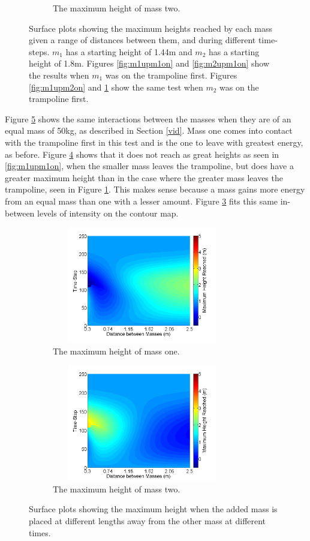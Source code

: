 \begin{figure}[H]
\begin{subfigure}{0.45\textwidth}
    	\caption{The maximum height of mass two.}\label{fig:m2upm2on}
    \end{subfigure}\hfill
    \caption{Surface plots showing the maximum heights reached by each mass given a range of distances between them, and during different time-steps. $m_1$ has a starting height of 1.44m and $m_2$ has a starting height of 1.8m. Figures \ref{fig:m1upm1on} and \ref{fig:m2upm1on} show the results when $m_1$ was on the trampoline first. Figures \ref{fig:m1upm2on} and \ref{fig:m2upm2on} show the same test when $m_2$ was on the trampoline first.}\label{fig:mup1on}
\end{figure}


\noindent Figure \ref{fig:msup} shows the same interactions between the masses when they are of an equal mass of 50kg, as described in Section \ref{vid}. Mass one comes into contact with the trampoline first in this test and is the one to leave with greatest energy, as before. Figure \ref{fig:m2sup} shows that it does not reach as great heights as seen in \ref{fig:m1upm1on}, when the smaller mass leaves the trampoline, but does have a greater maximum height than in the case where the greater mass leaves the trampoline, seen in Figure \ref{fig:m2upm2on}. This makes sense because a mass gains more energy from an equal mass than one with a lesser amount. Figure \ref{fig:m1sup} fits this same in-between levels of intensity on the contour map.
\begin{figure}[H]
	\centering
    \begin{subfigure}{0.45\textwidth}
		\includegraphics[width=3.1in, height=2in]{Hmson_m2.png}
    	\caption{The maximum height of mass one.}\label{fig:m1sup}
    \end{subfigure}\hfill
	\begin{subfigure}{0.45\textwidth}
		\includegraphics[width=3.1in, height=2in]{Hmson_m1.png}
    	\caption{The maximum height of mass two.}\label{fig:m2sup}
    \end{subfigure}\hfill
    \caption{Surface plots showing the maximum height when the added mass is placed at different lengths away from the other mass at different times.}\label{fig:msup}
\end{figure}
